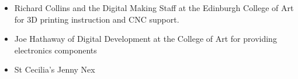 \documentclass[sigconf]{nimeart}
\providecommand{\tightlist}{%
  \setlength{\itemsep}{0pt}\setlength{\parskip}{0pt}}
\begin{document}
\begin{acks}
\begin{itemize}
\begin{itemize}
    \begin{itemize}
    \tightlist
    \item
      Richard Collins and the Digital Making Staff at the Edinburgh
      College of Art for 3D printing instruction and CNC support.
    \item
      Joe Hathaway of Digital Development at the College of Art for
      providing electronics components
    \item
      St Cecilia's Jenny Nex
    \end{itemize}
  \end{itemize}
\end{itemize}
\end{acks}



\end{document}
